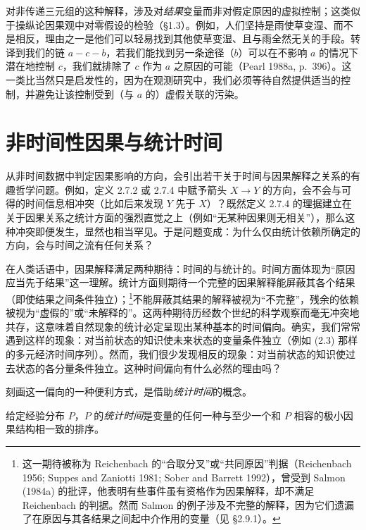对非传递三元组的这种解释，涉及对\emph{结果}变量而非对假定原因的虚拟控制；这类似于操纵论因果观中对零假设的检验（\S 1.3）。例如，人们坚持是雨使草变湿、而不是相反，理由之一是他们可以轻易找到其他使草变湿、且与雨全然无关的手段。转译到我们的链 $a-c-b$，若我们能找到另一条途径（$b$）可以在不影响 $a$ 的情况下潜在地控制 $c$，我们就排除了 $c$ 作为 $a$ 之原因的可能（Pearl 1988a, p.~396）。这一类比当然只是启发性的，因为在观测研究中，我们必须等待自然提供适当的控制，并避免让该控制受到（与 $a$ 的）虚假关联的污染。

\section{非时间性因果与统计时间}

从非时间数据中判定因果影响的方向，会引出若干关于时间与因果解释之关系的有趣哲学问题。例如，定义 2.7.2 或 2.7.4 中赋予箭头 $X\to Y$ 的方向，会不会与可得的时间信息相冲突（比如后来发现 $Y$ 先于 $X$）？既然定义 2.7.4 的理据建立在关于因果关系之统计方面的强烈直觉之上（例如“无某种因果则无相关”），那么这种冲突即便发生，显然也相当罕见。于是问题变成：为什么仅由统计依赖所确定的方向，会与时间之流有任何关系？

在人类话语中，因果解释满足两种期待：时间的与统计的。时间方面体现为“原因应当先于结果”这一理解。统计方面则期待一个完整的因果解释能屏蔽其各个结果（即使结果之间条件独立）；\footnote{这一期待被称为 Reichenbach 的“合取分叉”或“共同原因”判据（Reichenbach 1956; Suppes and Zaniotti 1981; Sober and Barrett 1992），曾受到 Salmon (1984a) 的批评，他表明有些事件虽有资格作为因果解释，却不满足 Reichenbach 的判据。然而 Salmon 的例子涉及不完整的解释，因为它们遗漏了在原因与其各结果之间起中介作用的变量（见 \S 2.9.1）。}不能屏蔽其结果的解释被视为“不完整”，残余的依赖被视为“虚假的”或“未解释的”。这两种期待历经数个世纪的科学观察而毫无冲突地共存，这意味着自然现象的统计必定呈现出某种基本的时间偏向。确实，我们常常遇到这样的现象：对当前状态的知识使未来状态的变量条件独立（例如 \textup{(2.3)} 那样的多元经济时间序列）。然而，我们很少发现相反的现象：对当前状态的知识使过去状态的各分量条件独立。这种时间偏向有什么必然的理由吗？

刻画这一偏向的一种便利方式，是借助\emph{统计时间}的概念。

\begin{definition}[统计时间]
给定经验分布 $P$，$P$ 的\emph{统计时间}是变量的任何一种与至少一个和 $P$ 相容的极小因果结构相一致的排序。
\end{definition}

